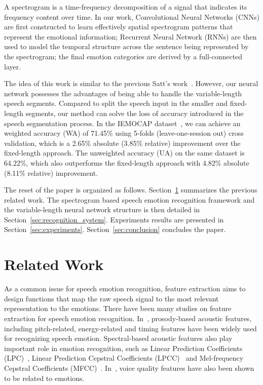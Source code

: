 \documentclass[a4paper]{article}
\begin{document}
A spectrogram is a time-frequency decomposition of a signal that indicates its frequency content over time. In our work, Convolutional Neural Networks (CNNs) are first constructed to learn effectively spatial spectrogram patterns that represent the emotional information; Recurrent Neural Network (RNNs) are then used to model the temporal structure across the sentence being represented by the spectrogram; the final emotion categories are derived by a full-connected layer.

The idea of this work is similar to the previous Satt's work~\cite{satt2017}. However, our neural network possesses the advantages of being able to handle the variable-length speech segments. Compared to split the speech input in the smaller and fixed-length segments, our method can solve the loss of accuracy introduced in the speech segmentation process. In the IEMOCAP dataset~\cite{busso2008}, we can achieve an weighted accuracy (WA) of 71.45\% using 5-folds (leave-one-session out) cross validation, which is a 2.65\% absolute (3.85\% relative) improvement over the fixed-length approach. The unweighted accuracy (UA) on the same dataset is 64.22\%, which also outperforms the fixed-length approach with 4.82\% absolute (8.11\% relative) improvement.

The reset of the paper is organized as follows. Section~\ref{sec:related_work} summarizes the previous related work. The spectrogram based speech emotion recognition framework and the variable-length neural network structure is then detailed in Section~\ref{sec:recognition_system}. Experiments results are presented in Section~\ref{sec:experiments}. Section~\ref{sec:conclusion} concludes the paper.

\section{Related Work}
\label{sec:related_work}

As a common issue for speech emotion recognition, feature extraction aims to design functions that map the raw speech signal to the most relevant representation to the emotions. There have been many studies on feature extraction for speech emotion recognition. In~\cite{ma2017, busso2009, cowie2001, vayrynen2013}, prosody-based acoustic features, including pitch-related, energy-related and timing features have been widely used for recognizing speech emotion. Spectral-based acoustic features also play important role in emotion recognition, such as Linear Prediction Coefficients (LPC)~\cite{bellanger1978}, Linear Prediction Cepstral Coefficients (LPCC)~\cite{atal1974} and Mel-frequency Cepstral Coefficients (MFCC)~\cite{davis1980}. In~\cite{gobl2003}, voice quality features have also been shown to be related to emotions.
\end{document}

